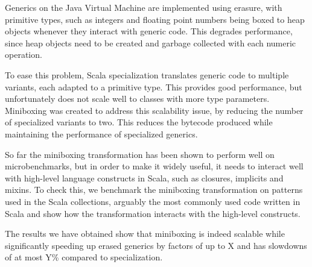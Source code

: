 Generics on the Java Virtual Machine are implemented using erasure, with primitive types, such as integers and floating point numbers being boxed to heap objects whenever they interact with generic code. This degrades performance, since heap objects need to be created and garbage collected with each numeric operation.

To ease this problem, Scala specialization translates generic code to multiple variants, each adapted to a primitive type. This provides good performance, but unfortunately does not scale well to classes with more type parameters. Miniboxing was created to address this scalability issue, by reducing the number of specialized variants to two. This reduces the bytecode produced while maintaining the performance of specialized generics.

So far the miniboxing transformation has been shown to perform well on microbenchmarks, but in order to make it widely useful, it needs to interact well with high-level language constructs in Scala, such as closures, implicits and mixins. To check this, we benchmark the miniboxing transformation on patterns used in the Scala collections, arguably the most commonly used code written in Scala and show how the transformation interacts with the high-level constructs.

The results we have obtained show that miniboxing is indeed scalable while significantly speeding up erased generics by factors of up to X and has slowdowns of at most Y\% compared to specialization.